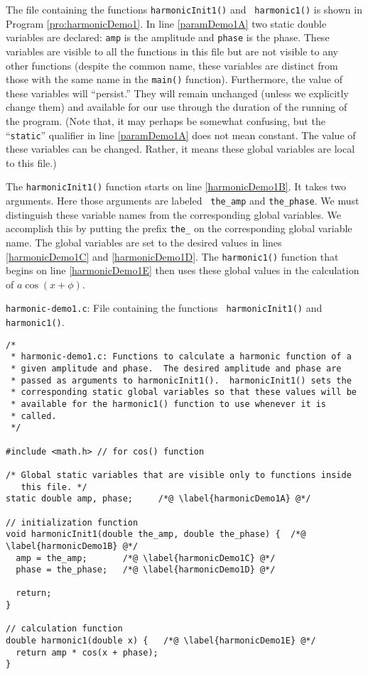The file containing the functions {\tt harmonicInit1()} and {\tt
  harmonic1()} is shown in Program \ref{pro:harmonicDemo1}.  In line
\ref{paramDemo1A} two static double variables are declared: {\tt amp}
is the amplitude and {\tt phase} is the phase.  These variables are
visible to all the functions in this file but are not visible to any
other functions (despite the common name, these variables are distinct
from those with the same name in the {\tt main()} function).
Furthermore, the value of these variables will ``persist.''  They will
remain unchanged (unless we explicitly change them) and available for
our use through the duration of the running of the program.  (Note
that, it may perhaps be somewhat confusing, but the ``{\tt static}''
qualifier in line \ref{paramDemo1A} does not mean constant.  The value
of these variables can be changed.  Rather, it means these global
variables are local to this file.)

The {\tt harmonicInit1()} function starts on line \ref{harmonicDemo1B}.
It takes two arguments.  Here those arguments are labeled {\tt
  the\_amp} and {\tt the\_phase}.  We must distinguish these variable
names from the corresponding global variables.  We accomplish this by
putting the prefix {\tt the\_} on the corresponding global variable
name.  The global variables are set to the desired values in lines
\ref{harmonicDemo1C} and \ref{harmonicDemo1D}.  The {\tt harmonic1()}
function that begins on line \ref{harmonicDemo1E} then uses these
global values in the calculation of $a \cos(x+\phi)$.

\begin{program}
{\tt harmonic-demo1.c}: File containing the functions {\tt
  harmonicInit1()} and {\tt harmonic1()}.
\label{pro:harmonicDemo1}
\codemiddle
\begin{lstlisting}
/* 
 * harmonic-demo1.c: Functions to calculate a harmonic function of a
 * given amplitude and phase.  The desired amplitude and phase are
 * passed as arguments to harmonicInit1().  harmonicInit1() sets the
 * corresponding static global variables so that these values will be
 * available for the harmonic1() function to use whenever it is
 * called.
 */

#include <math.h> // for cos() function

/* Global static variables that are visible only to functions inside
   this file. */
static double amp, phase;     /*@ \label{harmonicDemo1A} @*/

// initialization function
void harmonicInit1(double the_amp, double the_phase) {  /*@ \label{harmonicDemo1B} @*/
  amp = the_amp;       /*@ \label{harmonicDemo1C} @*/
  phase = the_phase;   /*@ \label{harmonicDemo1D} @*/

  return;
}

// calculation function
double harmonic1(double x) {   /*@ \label{harmonicDemo1E} @*/
  return amp * cos(x + phase);
}
\end{lstlisting}
\end{program}

